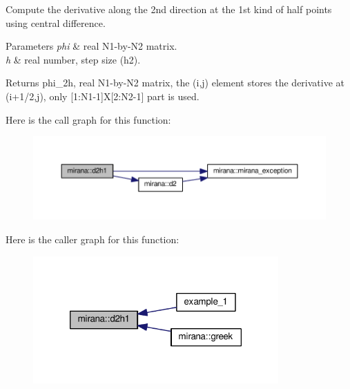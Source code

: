 Compute the derivative along the 2nd direction at the 1st kind of half points using central difference. 


\begin{DoxyParams}{Parameters}
{\em phi} & real N1-\/by-\/\-N2 matrix. \\
\hline
{\em h} & real number, step size (h2). \\
\hline
\end{DoxyParams}
\begin{DoxyReturn}{Returns}
phi\-\_\-2h, real N1-\/by-\/\-N2 matrix, the (i,j) element stores the derivative at (i+1/2,j), only \mbox{[}1\-:N1-\/1\mbox{]}X\mbox{[}2\-:N2-\/1\mbox{]} part is used. 
\end{DoxyReturn}


Here is the call graph for this function\-:\nopagebreak
\begin{figure}[H]
\begin{center}
\leavevmode
\includegraphics[width=350pt]{classmirana_a9341f957abd27c5132c557ae873055bd_cgraph}
\end{center}
\end{figure}




Here is the caller graph for this function\-:\nopagebreak
\begin{figure}[H]
\begin{center}
\leavevmode
\includegraphics[width=266pt]{classmirana_a9341f957abd27c5132c557ae873055bd_icgraph}
\end{center}
\end{figure}


